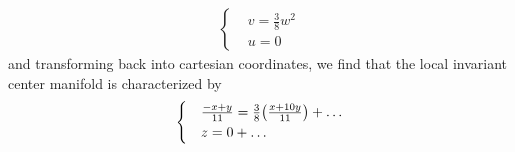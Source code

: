 \documentclass[12pt]{report}
\begin{document}
\begin{solution}
\begin{enumerate}
\begin{align*}
\begin{cases}
                &v = \frac{3}{8}w^2\\
                &u = 0
            \end{cases}
        \end{align*}
        and transforming back into cartesian coordinates, we find that the local invariant center manifold is characterized by
        \[ 
            \begin{cases}
                &\frac{-x+y}{11} = \frac{3}{8}{\left(\frac{x+10y}{11}\right)} + \dots\\
                &z = 0 + \dots
            \end{cases}
        \]
    \end{enumerate}
\end{solution}

\newpage
\end{document}
